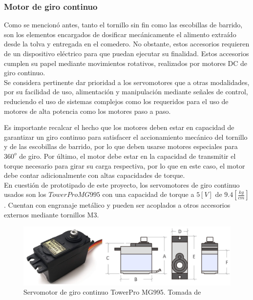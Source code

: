 \subsubsection{Motor de giro continuo}\label{mg995}

Como se mencionó antes, tanto el tornillo sin fin como las escobillas de barrido, son los elementos encargados de dosificar mecánicamente el alimento extraído desde la tolva y entregada en el comedero. No obstante, estos accesorios requieren de un dispositivo eléctrico para que puedan ejecutar su finalidad. Estos accesorios cumplen su papel mediante movimientos rotativos, realizados por motores DC de giro continuo.\\

Se considera pertinente dar prioridad a los servomotores que a otras modalidades, por su facilidad de uso, alimentación y manipulación mediante señales de control, reduciendo el uso de sistemas complejos como los requeridos para el uso de motores de alta potencia como los motores paso a paso.

Es importante recalcar el hecho que los motores deben estar en capacidad de garantizar un giro continuo para satisfacer el accionamiento mecánico del tornillo y de las escobillas de barrido, por lo que deben usarse motores especiales para $360^{o}$ de giro.
Por último, el motor debe estar en la capacidad de transmitir el torque necesario para girar su carga respectiva, por lo que en este caso, el motor debe contar adicionalmente con altas capacidades de torque.\\

En cuestión de prototipado de este proyecto, los servomotores de giro continuo usados son los $Tower Pro  MG995$ con una capacidad de torque a $5[V]$ de $9.4\left[\frac{kg}{cm}\right]$. Cuentan con engranaje metálico y pueden ser acoplados a otros accesorios externos mediante tornillos M3.

\begin{figure}[H]
    \begin{center}
    	\includegraphics[scale=0.35]{img/servopro.png}
    \end{center}
    \caption{Servomotor de giro continuo TowerPro MG995. Tomada de \cite{servopro} \label{servopropng}}
\end{figure}


